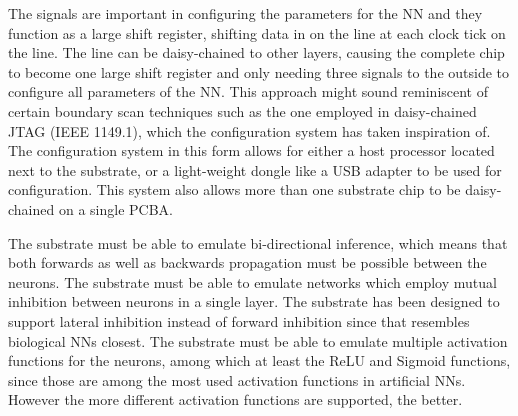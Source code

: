 The  signals are important in configuring the parameters for the \ac{NN} and they function as a large shift register, shifting data in on the  line at each clock tick on the  line. The  line can be daisy-chained to other layers, causing the complete chip to become one large shift register and only needing three signals to the outside to configure all parameters of the \ac{NN}. This approach might sound reminiscent of certain boundary scan techniques such as the one employed in daisy-chained JTAG (IEEE 1149.1), which the configuration system has taken inspiration of. The configuration system in this form allows for either a host processor located next to the substrate, or a light-weight dongle like a USB adapter to be used for configuration. This system also allows more than one substrate chip to be daisy-chained on a single \ac{PCBA}.











\begin{itemize}
    
    The substrate must be able to emulate bi-directional inference, which means that both forwards as well as backwards propagation must be possible between the neurons.
    The substrate must be able to emulate networks which employ mutual inhibition between neurons in a single layer. The substrate has been designed to support lateral inhibition instead of forward inhibition since that resembles biological \acp{NN} closest. 
    The substrate must be able to emulate multiple activation functions for the neurons, among which at least the \ac{ReLU} and Sigmoid functions, since those are among the most used activation functions in artificial \acp{NN}\cite{8192463}. However the more different activation functions are supported, the better.
  \bfit{}
\end{itemize}



